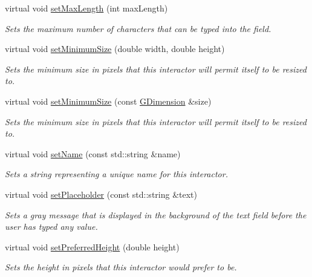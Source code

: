 \begin{DoxyCompactItemize}
virtual void \mbox{\hyperlink{classGTextField_a077c24fa5337fbf431738f8ba513d19c}{set\+Max\+Length}} (int max\+Length)
\begin{DoxyCompactList}\small\item\em Sets the maximum number of characters that can be typed into the field. \end{DoxyCompactList}\item 
virtual void \mbox{\hyperlink{classGInteractor_a0cf428e207b7f22cc08138a90b1b87b2}{set\+Minimum\+Size}} (double width, double height)
\begin{DoxyCompactList}\small\item\em Sets the minimum size in pixels that this interactor will permit itself to be resized to. \end{DoxyCompactList}\item 
virtual void \mbox{\hyperlink{classGInteractor_a3b1046117ac6cb7abe467e00ba8a81f4}{set\+Minimum\+Size}} (const \mbox{\hyperlink{classGDimension}{G\+Dimension}} \&size)
\begin{DoxyCompactList}\small\item\em Sets the minimum size in pixels that this interactor will permit itself to be resized to. \end{DoxyCompactList}\item 
virtual void \mbox{\hyperlink{classGInteractor_a9d3a2685df23b5e7cbf59c19c4a1f9b5}{set\+Name}} (const std\+::string \&name)
\begin{DoxyCompactList}\small\item\em Sets a string representing a unique name for this interactor. \end{DoxyCompactList}\item 
virtual void \mbox{\hyperlink{classGTextField_aa21a9bebb4652ab6780d0c11eff47aee}{set\+Placeholder}} (const std\+::string \&text)
\begin{DoxyCompactList}\small\item\em Sets a gray message that is displayed in the background of the text field before the user has typed any value. \end{DoxyCompactList}\item 
virtual void \mbox{\hyperlink{classGInteractor_a1ab987704fce32098706c6f00fb08218}{set\+Preferred\+Height}} (double height)
\begin{DoxyCompactList}\small\item\em Sets the height in pixels that this interactor would prefer to be. \end{DoxyCompactList}\item 

\end{DoxyCompactItemize}
